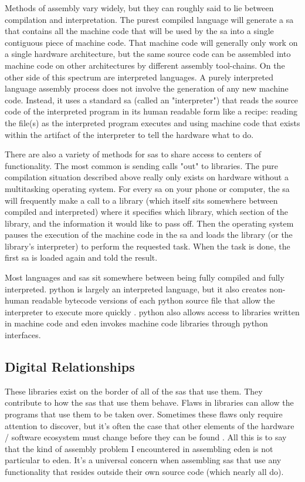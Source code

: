 \documentclass[a4paper,man,natbib,floatsintext]{apa6}
\begin{document}
   Methods of assembly vary widely, but they can roughly said to lie between compilation and interpretation. The purest compiled language will generate a \gls{sa} that contains all the machine code that will be used by the \gls{sa} into a single contiguous piece of machine code. That machine code will generally only work on a single hardware architecture, but the same source code can be assembled into machine code on other architectures by different assembly tool-chains. On the other side of this spectrum are interpreted languages. A purely interpreted language assembly process does not involve the generation of any new machine code. Instead, it uses a standard \gls{sa} (called an "interpreter") that reads the source code of the interpreted program in its human readable form like a recipe: reading the file(s) as the interpreted program executes and using machine code that exists within the artifact of the interpreter to tell the hardware what to do.

   There are also a variety of methods for \glspl{sa} to share access to centers of functionality. The most common is sending calls "out" to libraries. The pure compilation situation described above really only exists on hardware without a multitasking operating system. For every \gls{sa} on your phone or computer, the \gls{sa} will frequently make a call to a library (which itself sits somewhere between compiled and interpreted) where it specifies which library, which section of the library, and the information it would like to pass off. Then the operating system pauses the execution of the machine code in the \gls{sa} and loads the library (or the library's interpreter) to perform the requested task. When the task is done, the first \gls{sa} is loaded again and told the result. 

   Most languages and \glspl{sa} sit somewhere between being fully compiled and fully interpreted. \Gls{python} is largely an interpreted language, but it also creates non-human readable bytecode versions of each python source file that allow the interpreter to execute more quickly \citep{The_Python_Software_Foundation2020-qz}. \Gls{python} also allows access to libraries written in machine code and \acrshort{eden} invokes machine code libraries through \gls{python} interfaces.

   \subsection*{Digital Relationships}
   These libraries exist on the border of all of the \glspl{sa} that use them. They contribute to how the \glspl{sa} that use them behave. Flaws in libraries can allow the programs that use them to be taken over. Sometimes these flaws only require attention to discover, but it's often the case that other elements of the hardware / software ecosystem must change before they can be found \citep{Huang2003-ki}. All this is to say that the kind of assembly problem I encountered in assembling \acrshort{eden} is not particular to \acrshort{eden}. It's a universal concern when assembling \glspl{sa} that use any functionality that resides outside their own source code (which nearly all do).
\end{document}
